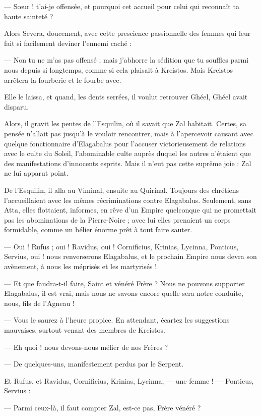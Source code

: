 \documentclass[a4paper, 11pt, oneside, polutonikogreek, french]{article}
\begin{document}
--- Sœur ! t'ai-je offensée, et pourquoi cet accueil pour celui qui reconnaît ta haute sainteté ?

Alors Severa, doucement, avec cette prescience passionnelle des femmes qui leur fait si facilement deviner l'ennemi caché :

--- Non tu ne m'as pas offensé ; mais j'abhorre la sédition que tu souffles parmi nous depuis si longtemps, comme si cela plaisait à Kreistos. Mais Kreistos arrêtera la fourberie et le fourbe avec.

Elle le laissa, et quand, les dents serrées, il voulut retrouver Ghéel, Ghéel avait disparu.

Alors, il gravit les pentes de l'Esquilin, où il savait que Zal habitait. Certes, sa pensée n'allait pas jusqu'à le vouloir rencontrer, mais à l'apercevoir causant avec quelque fonctionnaire d'Elagabalus pour l'accuser victorieusement de relations avec le culte du Soleil, l'abominable culte auprès duquel les autres n'étaient que des manifestations d'innocents esprits. Mais il n'eut pas cette suprême joie : Zal ne lui apparut point.

De l'Esquilin, il alla au Viminal, ensuite au Quirinal. Toujours des chrétiens l'accueillaient avec les mêmes récriminations contre Elagabalus. Seulement, sans Atta, elles flottaient, informes, en rêve d'un Empire quelconque qui ne promettait pas les abominations de la Pierre-Noire ; avec lui elles prenaient un corps formidable, comme un bélier énorme prêt à tout faire sauter.

--- Oui ! Rufus ; oui ! Ravidus, oui ! Cornificius, Krinias, Lycinna, Ponticus, Servius, oui ! nous renverserons Elagabalus, et le prochain Empire nous devra son avènement, à nous les méprisés et les martyrisés !

--- Et que faudra-t-il faire, Saint et vénéré Frère ? Nous ne pouvons supporter Elagabalus, il est vrai, mais nous ne savons encore quelle sera notre conduite, nous, fils de l'Agneau !

--- Vous le saurez à l'heure propice. En attendant, écartez les suggestions mauvaises, surtout venant des membres de Kreistos.

--- Eh quoi ! nous devons-nous méfier de nos Frères ?

--- De quelques-uns, manifestement perdus par le Serpent.

Et Rufus, et Ravidus, Cornificius, Krinias, Lycinna, --- une femme ! --- Ponticus, Servius :

--- Parmi ceux-là, il faut compter Zal, est-ce pas, Frère vénéré ?
\end{document}
